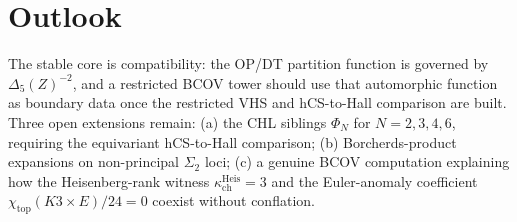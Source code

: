 \documentclass[11pt]{article}
\theoremstyle{plain}
\theoremstyle{definition}
\theoremstyle{remark}
\providecommand{\kch}{\kappa_{\mathrm{ch}}}
\begin{document}
\section{Outlook}
\label{sec:outlook}

The stable core is compatibility: the OP/DT partition function is
governed by $\Delta_5(Z)^{-2}$, and a restricted BCOV tower should use
that automorphic function as boundary data once the restricted VHS and
hCS-to-Hall comparison are built. Three open extensions remain:
(a) the CHL siblings $\Phi_N$ for $N=2,3,4,6$, requiring the
equivariant hCS-to-Hall comparison; (b) Borcherds-product expansions on
non-principal $\Sigma_2$ loci; (c) a genuine BCOV computation explaining
how the Heisenberg-rank witness $\kch^{\mathrm{Heis}}=3$ and the
Euler-anomaly coefficient $\chi_{\mathrm{top}}(K3\times E)/24=0$
coexist without conflation.
\end{document}
